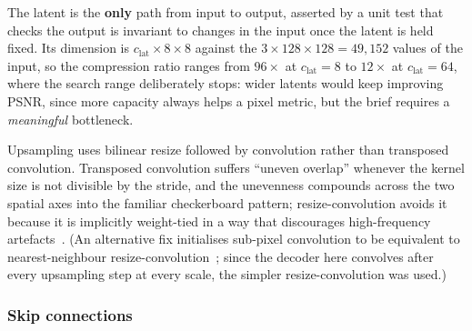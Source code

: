 \documentclass[conference]{IEEEtran}
\begin{document}
The latent is the \textbf{only} path from input to output, asserted by a unit
test that checks the output is invariant to changes in the input once the latent
is held fixed. Its dimension is $c_\text{lat} \times 8 \times 8$ against the
$3 \times 128 \times 128 = 49{,}152$ values of the input, so the compression
ratio ranges from $96\times$ at $c_\text{lat} = 8$ to $12\times$ at
$c_\text{lat} = 64$, where the search range deliberately stops: wider latents
would keep improving PSNR, since more capacity always helps a pixel metric, but
the brief requires a \emph{meaningful} bottleneck.

Upsampling uses bilinear resize followed by convolution rather than transposed
convolution. Transposed convolution suffers ``uneven overlap'' whenever the
kernel size is not divisible by the stride, and the unevenness compounds across
the two spatial axes into the familiar checkerboard pattern;
resize-convolution avoids it because it is implicitly weight-tied in a way that
discourages high-frequency artefacts~\cite{odena2016deconvolution}. (An
alternative fix initialises sub-pixel convolution to be equivalent to
nearest-neighbour resize-convolution~\cite{aitken2017checkerboard,shi2016real};
since the decoder here convolves after every upsampling step at every scale, the
simpler resize-convolution was used.)

\subsubsection{Skip connections}
\end{document}
